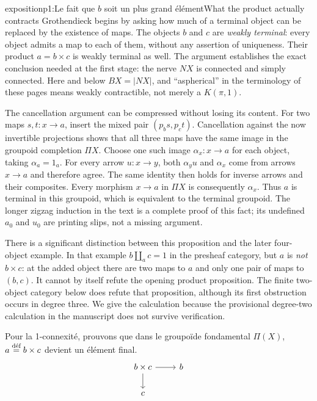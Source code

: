 \begin{dcomment}{exposition}{p1:Le fait que $b$ soit un plus grand élément}{What the product actually contracts}
Grothendieck begins by asking how much of a terminal object can be replaced by the existence of maps. The objects $b$ and $c$ are \emph{weakly terminal}: every object admits a map to each of them, without any assertion of uniqueness. Their product $a=b\times c$ is weakly terminal as well. The argument establishes the exact conclusion needed at the first stage: the nerve $NX$ is connected and simply connected. Here and below $BX=|NX|$, and ``aspherical'' in the terminology of these pages means weakly contractible, not merely a $K(\pi,1)$.

The cancellation argument can be compressed without losing its content. For two maps $s,t:x\to a$, insert the mixed pair $(p_bs,p_ct)$. Cancellation against the now invertible projections shows that all three maps have the same image in the groupoid completion $\Pi X$. Choose one such image $\alpha_x:x\to a$ for each object, taking $\alpha_a=1_a$. For every arrow $u:x\to y$, both $\alpha_yu$ and $\alpha_x$ come from arrows $x\to a$ and therefore agree. The same identity then holds for inverse arrows and their composites. Every morphism $x\to a$ in $\Pi X$ is consequently $\alpha_x$. Thus $a$ is terminal in this groupoid, which is equivalent to the terminal groupoid. The longer zigzag induction in the text is a complete proof of this fact; its undefined $a_0$ and $u_0$ are printing slips, not a missing argument.

There is a significant distinction between this proposition and the later four-object example. In that example $b\amalg_a c=1$ in the presheaf category, but $a$ is \emph{not} $b\times c$: at the added object there are two maps to $a$ and only one pair of maps to $(b,c)$. It cannot by itself refute the opening product proposition. The finite two-object category below does refute that proposition, although its first obstruction occurs in degree three. We give the calculation because the provisional degree-two calculation in the manuscript does not survive verification.
\end{dcomment}


Pour la 1-connexité, prouvons que dans le groupoïde fondamental $\Pi(X)$, $a \deq b\times c$ devient un élément final.
\[
\begin{tikzcd}
b\times c \arrow[r] \arrow[d] & b \\
c &
\end{tikzcd}
\]

